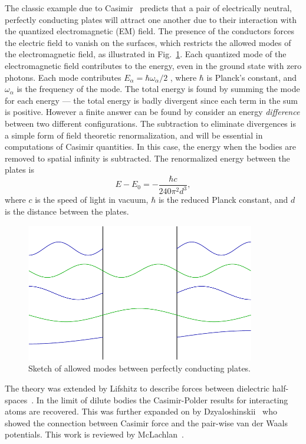 \begin{itemize}
The classic example due to Casimir~\cite{Casimir1948} predicts that a pair of electrically neutral,
perfectly conducting plates will attract one another due to their interaction with the quantized 
electromagnetic (EM) field.  
The presence of the conductors forces the electric field to vanish on the surfaces,
which restricts the allowed modes of the electromagnetic field, as illustrated in Fig.~\ref{fig:Casimir_sketch}.
Each quantized mode of the electromagnetic field contributes
to the energy, even in the ground state with zero photons.  Each mode contributes 
$E_\alpha=\hbar\omega_\alpha/2$ , where $\hbar$ is Planck's  constant, and $\omega_\alpha$ is the frequency of the mode.
The total energy is found by summing the mode for each energy --- the total energy is
badly divergent since each term in the sum is positive.  However a finite answer can 
be found by consider an energy \emph{difference} between two different configurations.  
The subtraction to eliminate divergences is a simple form of field theoretic renormalization, 
and will be essential in computations of Casimir quantities.  
In this case, the energy when the bodies are removed to spatial infinity is subtracted.  
The renormalized energy between the plates is
\begin{equation}
  E-E_0 = -\frac{\hbar c}{240\pi^2 d^3},
\end{equation}
where $c$ is the speed of light in vacuum, $\hbar$ is the reduced Planck constant,
and $d$ is the distance between the plates.  

\begin{figure}
\center
\includegraphics[width=10cm]{fig/intro/twoplanes_wave}
\caption{Sketch of allowed modes between perfectly conducting plates.}
\label{fig:Casimir_sketch}
\end{figure}

The theory was extended by Lifshitz to describe forces between dielectric half-spaces~\cite{Lifshitz1956}.
In the limit of dilute bodies the Casimir-Polder results for interacting atoms are recovered.  
This was further expanded on by Dzyaloshinskii~\etal\cite{Dzyaloshinskii1959,Dzyaloshinskii1961} who
showed the connection between Casimir force and the pair-wise van der Waals potentials.  
This work is reviewed by McLachlan~\cite{McLachlan1963, McLachlan1963a}.  



\end{itemize}
